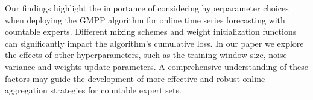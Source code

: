 \documentclass{icorsdssv2024}
\begin{document}
Our findings highlight the importance of  considering hyperparameter choices when deploying the GMPP algorithm for online time series forecasting with countable experts. Different mixing schemes and weight initialization functions can significantly impact the algorithm's cumulative loss. In our paper we explore the effects of other hyperparameters, such as the training window size, noise variance and weights update parameters.
A comprehensive understanding of these factors may guide the development of more effective and robust online aggregation strategies for countable expert sets.




\end{document}
